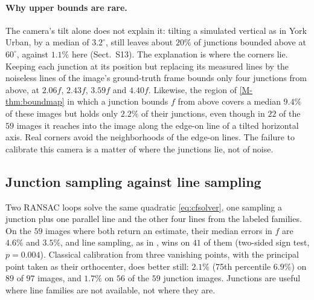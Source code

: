 \paragraph{Why upper bounds are rare.} The camera's tilt alone does not explain it: tilting a simulated vertical as in York Urban, by a median of $3.2^\circ$, still leaves about $20\%$ of junctions bounded above at $60^\circ$, against $1.1\%$ here (Sect.~S13). The explanation is where the corners lie. Keeping each junction at its position but replacing its measured lines by the noiseless lines of the image's ground-truth frame bounds only four junctions from above, at $2.06f$, $2.43f$, $3.59f$ and $4.40f$. Likewise, the region of \cref{M-thm:boundmap} in which a junction bounds $f$ from above covers a median $9.4\%$ of these images but holds only $2.2\%$ of their junctions, even though in $22$ of the $59$ images it reaches into the image along the edge-on line of a tilted horizontal axis. Real corners avoid the neighborhoods of the edge-on lines. The failure to calibrate this camera is a matter of where the junctions lie, not of noise.


\subsection{Junction sampling against line sampling}

Two RANSAC loops solve the same quadratic \eqref{eq:cfsolver}, one sampling a junction plus one parallel line and the other four lines from the labeled families. On the $59$ images where both return an estimate, their median errors in $f$ are $4.6\%$ and $3.5\%$, and line sampling, as in \citet{wildenauer2012}, wins on $41$ of them (two-sided sign test, $p=0.004$). Classical calibration from three vanishing points, with the principal point taken as their orthocenter, does better still: $2.1\%$ (75th percentile $6.9\%$) on $89$ of $97$ images, and $1.7\%$ on $56$ of the $59$ junction images. Junctions are useful where line families are not available, not where they are.

